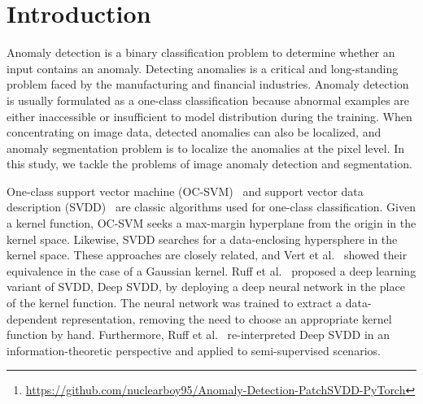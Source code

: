 \documentclass[runningheads]{llncs}
\begin{document}
\newcommand{\etal}{\emph{et al.}} 
\begin{abstract}
In this paper, we address the problem of image anomaly detection and segmentation.
Anomaly detection involves making a binary decision as to whether an input image contains an anomaly, and anomaly segmentation aims to locate the anomaly on the pixel level.
Support vector data description (SVDD) is a long-standing algorithm used for an anomaly detection, and we extend its deep learning variant to the patch-based method using self-supervised learning.
This extension enables anomaly segmentation and improves detection performance.
As a result, anomaly detection and segmentation performances measured in AUROC on MVTec AD dataset increased by 9.8\% and 7.0\%, respectively, compared to the previous state-of-the-art methods.
Our results indicate the efficacy of the proposed method and its potential for industrial application.
Detailed analysis of the proposed method offers insights regarding its behavior, and the code is available online\footnote{\url{https://github.com/nuclearboy95/Anomaly-Detection-PatchSVDD-PyTorch}}.
\end{abstract} \section{Introduction}
Anomaly detection is a binary classification problem to determine whether an input contains an anomaly.
Detecting anomalies is a critical and long-standing problem faced by the manufacturing and financial industries.
Anomaly detection is usually formulated as a one-class classification because abnormal examples are either inaccessible or insufficient to model distribution during the training.
When concentrating on image data, detected anomalies can also be localized, and anomaly segmentation problem is to localize the anomalies at the pixel level.
In this study, we tackle the problems of image anomaly detection and segmentation.

One-class support vector machine (OC-SVM)~\cite{ocsvm} and support vector data description (SVDD)~\cite{svdd} are classic algorithms used for one-class classification.
Given a kernel function, OC-SVM seeks a max-margin hyperplane from the origin in the kernel space.
Likewise, SVDD searches for a data-enclosing hypersphere in the kernel space.
These approaches are closely related, and Vert et al.~\cite{ocsvm_consistency} showed their equivalence in the case of a Gaussian kernel.
Ruff et al.~\cite{deepSVDD} proposed a deep learning variant of SVDD, Deep SVDD, by deploying a deep neural network in the place of the kernel function.
The neural network was trained to extract a data-dependent representation, removing the need to choose an appropriate kernel function by hand.
Furthermore, Ruff et al.~\cite{deep_sad} re-interpreted Deep SVDD in an information-theoretic perspective and applied to semi-supervised scenarios.
\end{document}
